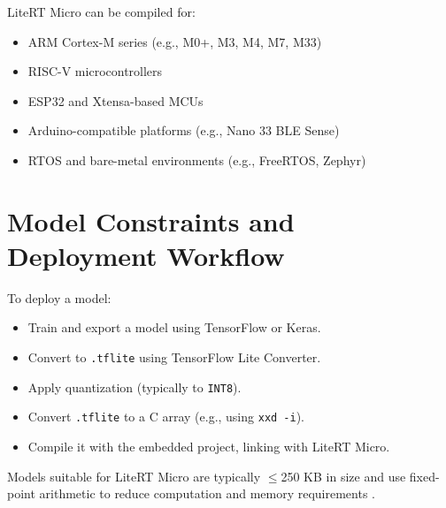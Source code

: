 LiteRT Micro can be compiled for:



\begin{itemize}

	\item ARM Cortex-M series (e.g., M0+, M3, M4, M7, M33)

	\item RISC-V microcontrollers

	\item ESP32 and Xtensa-based MCUs

	\item Arduino-compatible platforms (e.g., Nano 33 BLE Sense)

	\item RTOS and bare-metal environments (e.g., FreeRTOS, Zephyr)

\end{itemize}



\section{Model Constraints and Deployment Workflow}



To deploy a model:



\begin{itemize}

	\item Train and export a model using TensorFlow or Keras.

	\item Convert to \texttt{.tflite} using TensorFlow Lite Converter.

	\item Apply quantization (typically to \texttt{INT8}).

	\item Convert \texttt{.tflite} to a C array (e.g., using \texttt{xxd -i}).

	\item Compile it with the embedded project, linking with LiteRT Micro.

\end{itemize}



Models suitable for LiteRT Micro are typically $\leq$250 KB in size and use fixed-point arithmetic to reduce computation and memory requirements \cite{Google:2025a}.



